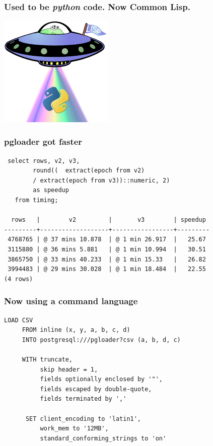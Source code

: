 \documentclass{beamer}
\begin{document}
\begin{frame}
  \frametitle{Used to be \textit{python} code. Now Common Lisp.}

  \begin{center}
    \includegraphics[height=2.1in]{lisp-python.png}
  \end{center}
\end{frame}

\begin{frame}[fragile]
  \frametitle{pgloader got faster}

  \begin{verbatim}
 select rows, v2, v3,
        round((  extract(epoch from v2)
        / extract(epoch from v3))::numeric, 2)
        as speedup
   from timing;
        
  rows   |        v2         |       v3        | speedup 
---------+-------------------+-----------------+---------
 4768765 | @ 37 mins 10.878  | @ 1 min 26.917  |   25.67
 3115880 | @ 36 mins 5.881   | @ 1 min 10.994  |   30.51
 3865750 | @ 33 mins 40.233  | @ 1 min 15.33   |   26.82
 3994483 | @ 29 mins 30.028  | @ 1 min 18.484  |   22.55
(4 rows)
  \end{verbatim}
\end{frame}


\begin{frame}[fragile]
  \frametitle{Now using a command language}

  \begin{verbatim}
LOAD CSV
     FROM inline (x, y, a, b, c, d)
     INTO postgresql:///pgloader?csv (a, b, d, c)

     WITH truncate,
          skip header = 1,
          fields optionally enclosed by '"',
          fields escaped by double-quote,
          fields terminated by ','

      SET client_encoding to 'latin1',
          work_mem to '12MB',
          standard_conforming_strings to 'on'
  \end{verbatim}
\end{frame}
\end{document}
